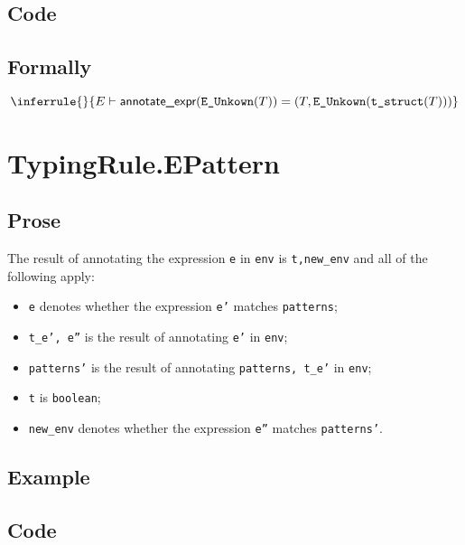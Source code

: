 \documentclass{book}
\newcommand\annotateexpr[1]{\textsf{annotate\_expr}(#1)}
\begin{document}
  \subsection{Code}

\begin{emptyformal}
    \subsection{Formally}
\[
\inferrule{}{E \entails \annotateexpr{\texttt{E\_Unkown}(T)} = (T, \texttt{E\_Unkown}(\tstruct(T)))}
\]
\end{emptyformal}


\section{TypingRule.EPattern \label{sec:TypingRule.EPattern}}

  \subsection{Prose}
  The result of annotating the expression \texttt{e} in \texttt{env} is
\texttt{t,new\_env} and all of the following apply:
  \begin{itemize}
  \item \texttt{e} denotes whether the expression \texttt{e'} matches \texttt{patterns};
  \item \texttt{t\_e', e''} is the result of annotating \texttt{e'} in \texttt{env};
  \item \texttt{patterns'} is the result of annotating \texttt{patterns, t\_e'} in \texttt{env};
  \item \texttt{t} is \texttt{boolean};
  \item \texttt{new\_env} denotes whether the expression \texttt{e''} matches \texttt{patterns'}.
  \end{itemize}

  \subsection{Example}

  \subsection{Code}
        
\end{document}
